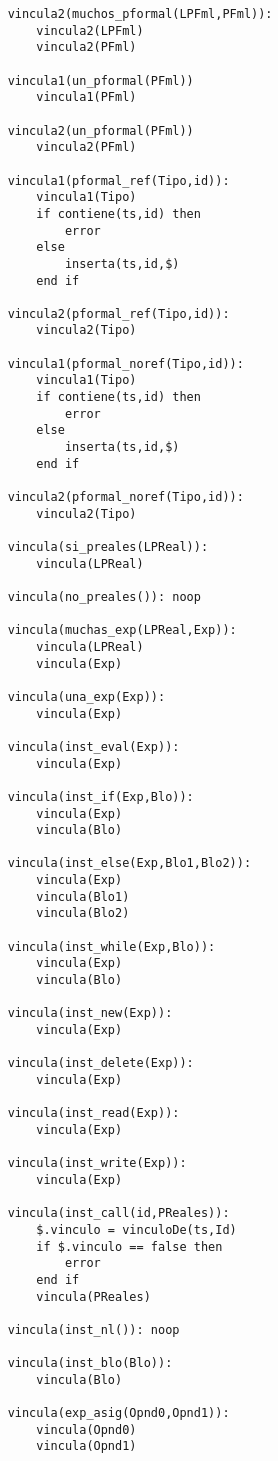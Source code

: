 \begin{lstlisting}
    vincula2(muchos_pformal(LPFml,PFml)):
        vincula2(LPFml)
        vincula2(PFml)

    vincula1(un_pformal(PFml))
        vincula1(PFml)

    vincula2(un_pformal(PFml))
        vincula2(PFml)

    vincula1(pformal_ref(Tipo,id)):
        vincula1(Tipo)
        if contiene(ts,id) then
            error
        else
            inserta(ts,id,$)
        end if

    vincula2(pformal_ref(Tipo,id)):
        vincula2(Tipo)

    vincula1(pformal_noref(Tipo,id)):
        vincula1(Tipo)
        if contiene(ts,id) then
            error
        else
            inserta(ts,id,$)
        end if

    vincula2(pformal_noref(Tipo,id)):
        vincula2(Tipo)

    vincula(si_preales(LPReal)):
        vincula(LPReal)

    vincula(no_preales()): noop

    vincula(muchas_exp(LPReal,Exp)):
        vincula(LPReal)
        vincula(Exp)

    vincula(una_exp(Exp)):
        vincula(Exp)

    vincula(inst_eval(Exp)):
        vincula(Exp)

    vincula(inst_if(Exp,Blo)):
        vincula(Exp)
        vincula(Blo)

    vincula(inst_else(Exp,Blo1,Blo2)):
        vincula(Exp)
        vincula(Blo1)
        vincula(Blo2)

    vincula(inst_while(Exp,Blo)):
        vincula(Exp)
        vincula(Blo)

    vincula(inst_new(Exp)):
        vincula(Exp)

    vincula(inst_delete(Exp)):
        vincula(Exp)

    vincula(inst_read(Exp)):
        vincula(Exp)

    vincula(inst_write(Exp)):
        vincula(Exp)

    vincula(inst_call(id,PReales)):
        $.vinculo = vinculoDe(ts,Id)
        if $.vinculo == false then
            error
        end if
        vincula(PReales)

    vincula(inst_nl()): noop

    vincula(inst_blo(Blo)):
        vincula(Blo)

    vincula(exp_asig(Opnd0,Opnd1)):
        vincula(Opnd0)
        vincula(Opnd1)


\end{lstlisting}
